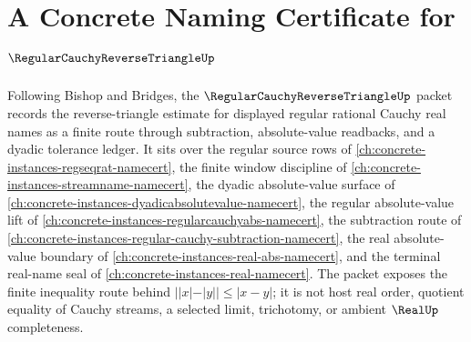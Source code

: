 \chapter{A Concrete Naming Certificate for $\RegularCauchyReverseTriangleUp$}
\label{ch:concrete-instances-regular-cauchy-reverse-triangle-namecert}

Following Bishop and Bridges, the $\RegularCauchyReverseTriangleUp$ packet records the reverse-triangle estimate for displayed regular rational Cauchy real names as a finite route through subtraction, absolute-value readbacks, and a dyadic tolerance ledger. It sits over the regular source rows of \autoref{ch:concrete-instances-regseqrat-namecert}, the finite window discipline of \autoref{ch:concrete-instances-streamname-namecert}, the dyadic absolute-value surface of \autoref{ch:concrete-instances-dyadicabsolutevalue-namecert}, the regular absolute-value lift of \autoref{ch:concrete-instances-regularcauchyabs-namecert}, the subtraction route of \autoref{ch:concrete-instances-regular-cauchy-subtraction-namecert}, the real absolute-value boundary of \autoref{ch:concrete-instances-real-abs-namecert}, and the terminal real-name seal of \autoref{ch:concrete-instances-real-namecert}. The packet exposes the finite inequality route behind $||x|-|y|| \leq |x-y|$; it is not host real order, quotient equality of Cauchy streams, a selected limit, trichotomy, or ambient $\RealUp$ completeness.

